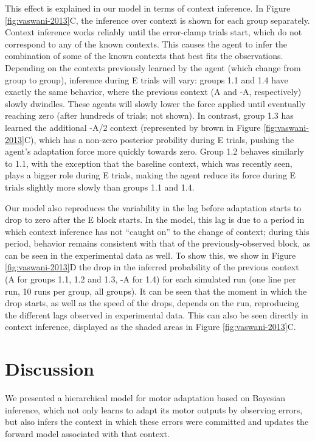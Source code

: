 \documentclass[a4paper,doc,floatsintext,natbib]{apa6}
\def \fref #1{Figure \ref{#1}}     %
\begin{document}
This effect is explained in our model in terms of context inference. In \fref{fig:vaswani-2013}C, the inference over context is shown for each group separately. Context inference works reliably until the error-clamp trials start, which do not correspond to any of the known contexts. This causes the agent to infer the combination of some of the known contexts that best fits the observations. Depending on the contexts previously learned by the agent (which change from group to group), inference during E trials will vary: groups 1.1 and 1.4 have exactly the same behavior, where the previous context (A and -A, respectively) slowly dwindles. These agents will slowly lower the force applied until eventually reaching zero (after hundreds of trials; not shown). In contrast, group 1.3 has learned the additional -A/2 context (represented by brown in \fref{fig:vaswani-2013}C), which has a non-zero posterior probility during E trials, pushing the agent's adaptation force more quickly towards zero. Group 1.2 behaves similarly to 1.1, with the exception that the baseline context, which was recently seen, plays a bigger role during E trials, making the agent reduce its force during E trials slightly more slowly than groups 1.1 and 1.4.

Our model also reproduces the variability in the lag before adaptation starts to drop to zero after the E block starts. In the model, this lag is due to a period in which context inference has not ``caught on'' to the change of context; during this period, behavior remains consistent with that of the previously-observed block, as can be seen in the experimental data as well. To show this, we show in \fref{fig:vaswani-2013}D the drop in the inferred probability of the previous context (A for groups 1.1, 1.2 and 1.3, -A for 1.4) for each simulated run (one line per run, 10 runs per group, all groups). It can be seen that the moment in which the drop starts, as well as the speed of the drops, depends on the run, reproducing the different lags observed in experimental data. This can also be seen directly in context inference, displayed as the shaded areas in \fref{fig:vaswani-2013}C.


\section{Discussion}
We presented a hierarchical model for motor adaptation based on Bayesian inference, which not only learns to adapt its motor outputs by observing errors, but also infers the context in which these errors were committed and updates the forward model associated with that context.
\end{document}
